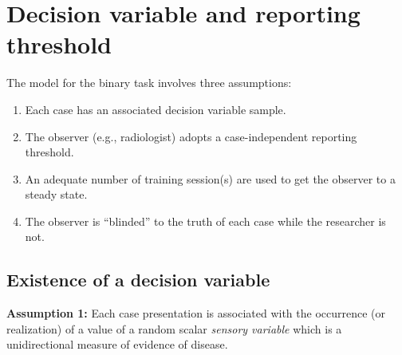 \documentclass[
]{book}
\begin{document}
\hypertarget{binary-task-model-z-sample-model}{%
\section{Decision variable and reporting threshold}\label{binary-task-model-z-sample-model}}

The model for the binary task involves three assumptions:

\begin{enumerate}
\def\labelenumi{\arabic{enumi}.}
\item
  Each case has an associated decision variable sample.
\item
  The observer (e.g., radiologist) adopts a case-independent reporting threshold.
\item
  An adequate number of training session(s) are used to get the observer to a steady state.
\item
  The observer is ``blinded'' to the truth of each case while the researcher is not.
\end{enumerate}

\hypertarget{existence-of-a-decision-variable}{%
\subsection{Existence of a decision variable}\label{existence-of-a-decision-variable}}

\textbf{Assumption 1:} Each case presentation is associated with the occurrence (or realization) of a value of a random scalar \emph{sensory variable} which is a unidirectional measure of evidence of disease.
\end{document}
